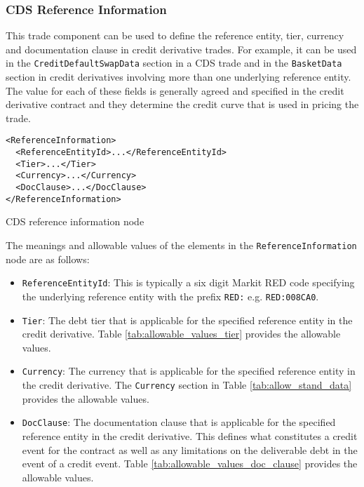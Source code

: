 \subsubsection{CDS Reference Information}
\label{ss:cds_reference_information} 

This trade component can be used to define the reference entity, tier, currency and documentation clause in credit derivative trades. For example, it can be used in the \lstinline!CreditDefaultSwapData! section in a CDS trade and in the \lstinline!BasketData! section in credit derivatives involving more than one underlying reference entity. The value for each of these fields is generally agreed and specified in the credit derivative contract and they determine the credit curve that is used in pricing the trade.

\begin{listing}[H]
\begin{verbatim}
<ReferenceInformation>
  <ReferenceEntityId>...</ReferenceEntityId>
  <Tier>...</Tier>
  <Currency>...</Currency>
  <DocClause>...</DocClause>
</ReferenceInformation>
\end{verbatim}
\caption{CDS reference information node}
\label{lst:cds_reference_information}
\end{listing}

The meanings and allowable values of the elements in the \lstinline!ReferenceInformation! node are as follows:

\begin{itemize}

\item \lstinline!ReferenceEntityId!:
This is typically a six digit Markit RED code specifying the underlying reference entity with the prefix \lstinline!RED:! e.g. \lstinline!RED:008CA0!.

\item \lstinline!Tier!:
The debt tier that is applicable for the specified reference entity in the credit derivative. Table \ref{tab:allowable_values_tier} provides the allowable values.

\item \lstinline!Currency!:
The currency that is applicable for the specified reference entity in the credit derivative. The \lstinline!Currency! section in Table \ref{tab:allow_stand_data} provides the allowable values.

\item \lstinline!DocClause!:
The documentation clause that is applicable for the specified reference entity in the credit derivative. This defines what constitutes a credit event for the contract as well as any limitations on the deliverable debt in the event of a credit event. Table \ref{tab:allowable_values_doc_clause} provides the allowable values.

\end{itemize}

